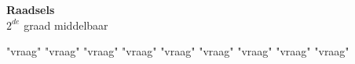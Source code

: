 \documentclass[12pt, a4paper]{article}
\begin{document}
	
	\begin{center}
		\Huge
		\textbf{Raadsels} \\
		\Large
		$2^{de}$ graad middelbaar
	\end{center}
	
	{"vraag"}
	{"vraag"}
	{"vraag"}
	{"vraag"}
	{"vraag"}
	{"vraag"}
	{"vraag"}
	{"vraag"}
	{"vraag"}
\end{document}
